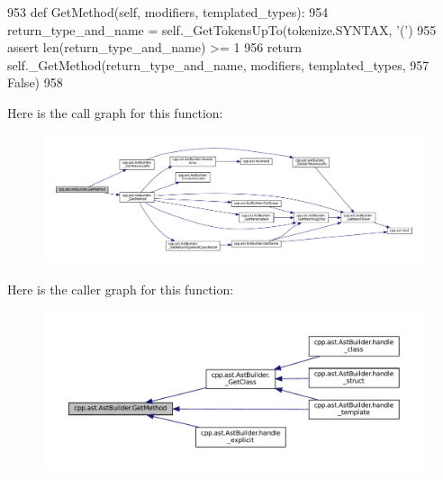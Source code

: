 \begin{DoxyCode}
953     \textcolor{keyword}{def }GetMethod(self, modifiers, templated\_types):
954         return\_type\_and\_name = self.\_GetTokensUpTo(tokenize.SYNTAX, \textcolor{stringliteral}{'('})
955         \textcolor{keyword}{assert} len(return\_type\_and\_name) >= 1
956         \textcolor{keywordflow}{return} self.\_GetMethod(return\_type\_and\_name, modifiers, templated\_types,
957                                \textcolor{keyword}{False})
958 
\end{DoxyCode}
Here is the call graph for this function\+:
\nopagebreak
\begin{figure}[H]
\begin{center}
\leavevmode
\includegraphics[width=350pt]{classcpp_1_1ast_1_1AstBuilder_af22fb880867876144d20818391ad267a_cgraph}
\end{center}
\end{figure}
Here is the caller graph for this function\+:
\nopagebreak
\begin{figure}[H]
\begin{center}
\leavevmode
\includegraphics[width=350pt]{classcpp_1_1ast_1_1AstBuilder_af22fb880867876144d20818391ad267a_icgraph}
\end{center}
\end{figure}
\mbox{\label{classcpp_1_1ast_1_1AstBuilder_a327957c4228325fc5f64821b047bdc6f}} 
